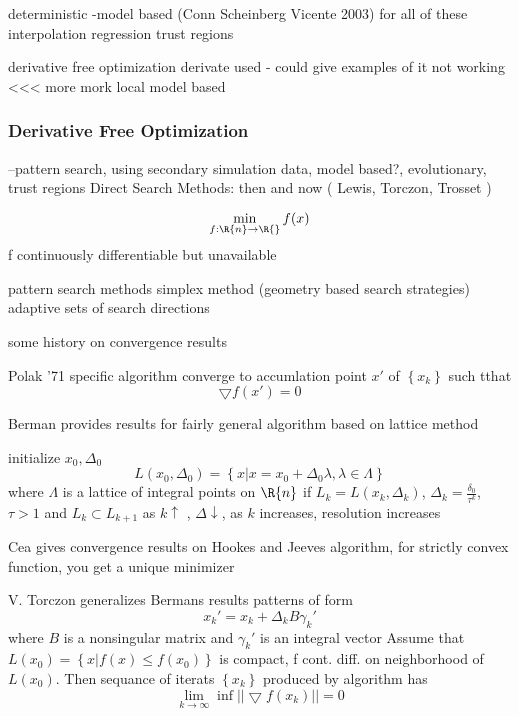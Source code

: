 deterministic
-model based (Conn Scheinberg Vicente 2003) for all of these
interpolation
regression
trust regions


derivative free optimization
derivate used - could give examples of it not working <<< more mork
local model based




\subsubsection{Derivative Free Optimization}
--pattern search, using secondary simulation data, model based?, evolutionary, trust regions
Direct Search Methods: then and now ( Lewis, Torczon, Trosset ) \cite{lewis_2000}

\begin{equation}
\min_{ f: \R{n} \rightarrow \R{}} f(x)
\end{equation}
f continuously differentiable but unavailable

pattern search methods
simplex method (geometry based search strategies)
adaptive sets of search directions

some history on convergence results

Polak '71 specific algorithm converge to accumlation point $x'$ of $\left\{x_k\right\}$ such tthat 
\begin{equation}
\bigtriangledown f(x') = 0
\end{equation}

Berman provides results for fairly general algorithm based on lattice method

initialize 
$x_0, \Delta_0$
\begin{equation}
L(x_0, \Delta_0) = \left\{ x | x = x_0 + \Delta_0 \lambda, \lambda \in \Lambda \right\}
\end{equation}
where $\Lambda $ is a lattice of integral points on $\R{n}$
if $L_k  = L(x_k, \Delta_k)$, $\Delta_k = \frac{\delta_0}{\tau^k}$, $\tau > 1$ and $L_k \subset L_{k+1}$
as $k \uparrow$ , $\Delta \downarrow$, as $k$ increases, resolution increases

Cea gives convergence results on Hookes and Jeeves algorithm, for strictly convex function, you get a unique minimizer

V. Torczon generalizes Bermans results
patterns of form 
\begin{equation}
x_k' = x_k + \Delta_k B \gamma_k'
\end{equation}
where $B$ is a nonsingular matrix and $\gamma_k'$ is an integral vector
Assume that $L(x_0) = \left\{ x | f(x)  \le f(x_0) \right\} $ is compact, f cont. diff. on neighborhood of $L(x_0)$.  Then sequance of iterats $\left\{ x_k \right\}$ produced by algorithm has
\begin{equation}
\lim_{k \rightarrow \infty} \inf || \bigtriangledown f (x_k) || = 0
\end{equation}


